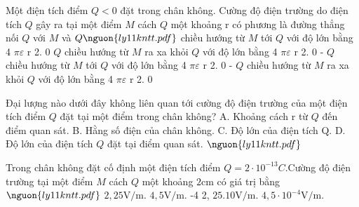 \begin{ex}
Một điện tích điểm $Q \lt  0$ đặt trong chân không. Cường độ điện trường do điện tích $Q$ gây ra tại một điểm $M$ cách $Q$ một khoảng r có phương là đường thẳng nối $Q$ với $M$ và $Q\nguon{ly11 kntt.pdf}$
\choice
{chiều hướng từ $M$ tới $Q$ với độ lớn bằng 4 $\pi\varepsilon$ r 2. 0 $Q$}
{chiều hướng từ $M$ ra xa khỏi $Q$ với độ lớn bằng 4 $\pi\varepsilon$ r 2. 0 - $Q$}
{\True chiều hướng từ $M$ tới $Q$ với độ lớn bằng 4 $\pi\varepsilon$ r 2. 0 - $Q$}
{chiều hướng từ $M$ ra xa khỏi $Q$ với độ lớn bằng 4 $\pi\varepsilon$ r 2. 0}
\end{ex}

\begin{bt}
Đại lượng nào dưới đây không liên quan tới cường độ điện trường của một điện tích điểm $Q$ đặt tại một điểm trong chân không? A. Khoảng cách r từ $Q$ đến điểm quan sát. B. Hằng số điện của chân không. C. Độ lớn của điện tích Q. D. Độ lớn của điện tích $Q$ đặt tại điểm quan sát. $\nguon{ly11 kntt.pdf}$
\end{bt}

\begin{ex}
Trong chân không đặt cố định một điện tích điểm $Q = 2 \cdot  10^{-13} C$.Cường độ điện trường tại một điểm $M$ cách $Q$ một khoảng $2 \mathrm{cm}$ có giá trị bằng $\nguon{ly11 kntt.pdf}$
\choice
{$2,25 \mathrm{V/m}$.}
{\True $4,5 \mathrm{V/m}$. -4}
{2, $25.10 \mathrm{V/m}$.}
{$4,5 \cdot  10^{-4} \mathrm{V/m}.$}
\end{ex}

